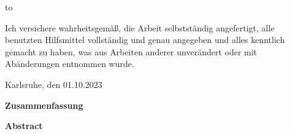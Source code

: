 \thispagestyle{empty}
\vspace*{42\baselineskip}
\hbox to \textwidth{\hrulefill}
\par
Ich versichere wahrheitsgemäß, die Arbeit selbstständig angefertigt, alle benutzten Hilfsmittel vollständig und genau angegeben und alles kenntlich gemacht zu haben, was aus Arbeiten anderer unverändert oder mit Abänderungen entnommen wurde.

Karlsruhe, den 01.10.2023

\cleardoublepage

\vspace*{1em}
\begin{center}
	\textbf{Zusammenfassung}
\end{center}
\par
{}
\cleardoublepage
\vspace*{1em}
\begin{center}
	\textbf{Abstract}
\end{center}
\par
{}

\cleardoublepage

